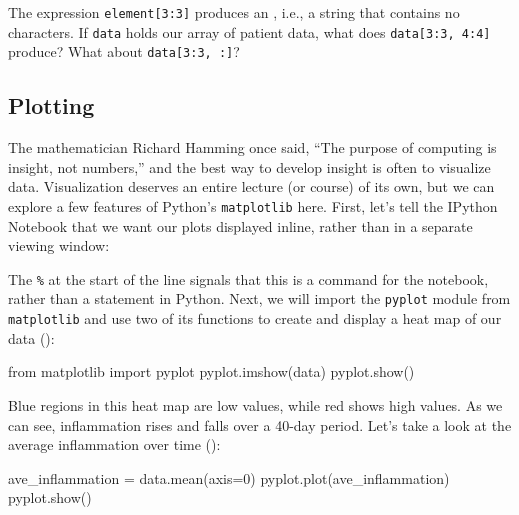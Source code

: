 \begin{challenge}
  The expression \texttt{element{[}3:3{]}} produces an
  , i.e., a string that contains
  no characters. If \texttt{data} holds our array of patient data, what
  does \texttt{data{[}3:3, 4:4{]}} produce? What about
  \texttt{data{[}3:3, :{]}}?
\end{challenge}

\subsection{Plotting}

The mathematician Richard Hamming once said, ``The purpose of computing
is insight, not numbers,'' and the best way to develop insight is often
to visualize data. Visualization deserves an entire lecture (or course)
of its own, but we can explore a few features of Python's
\texttt{matplotlib} here. First, let's tell the IPython Notebook that we
want our plots displayed inline, rather than in a separate viewing
window:

\begin{VerbIn}
\end{VerbIn}

The \texttt{\%} at the start of the line signals that this is a
command for the notebook, rather than a statement in Python. Next, we
will import the \texttt{pyplot} module from \texttt{matplotlib} and
use two of its functions to create and display a heat map of our data
():

\begin{VerbIn}
from matplotlib import pyplot
pyplot.imshow(data)
pyplot.show()
\end{VerbIn}


Blue regions in this heat map are low values, while red shows high
values. As we can see, inflammation rises and falls over a 40-day
period. Let's take a look at the average inflammation over time ():

\begin{VerbIn}
ave_inflammation = data.mean(axis=0)
pyplot.plot(ave_inflammation)
pyplot.show()
\end{VerbIn}


